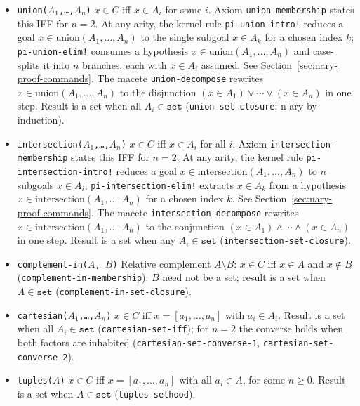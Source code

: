 \begin{itemize}

\item \texttt{union($A_1$,\ldots,$A_n$)}
  $x \in C$ iff $x \in A_i$ for some $i$.
  Axiom \texttt{union-membership} states this IFF for $n=2$.
  At any arity, the kernel rule \texttt{pi-union-intro!} reduces a goal
  $x \in \text{union}(A_1,\ldots,A_n)$ to the single subgoal $x \in A_k$
  for a chosen index $k$; \texttt{pi-union-elim!} consumes a hypothesis
  $x \in \text{union}(A_1,\ldots,A_n)$ and case-splits it into $n$
  branches, each with $x \in A_i$ assumed.  See
  Section~\ref{sec:nary-proof-commands}.
  The macete \texttt{union-decompose} rewrites
  $x \in \text{union}(A_1,\ldots,A_n)$ to the disjunction
  $(x \in A_1) \lor \cdots \lor (x \in A_n)$ in one step.
  Result is a set when all $A_i \in \mathtt{set}$
  (\texttt{union-set-closure}; n-ary by induction).

\item \texttt{intersection($A_1$,\ldots,$A_n$)}
  $x \in C$ iff $x \in A_i$ for all $i$.
  Axiom \texttt{intersection-membership} states this IFF for $n=2$.
  At any arity, the kernel rule \texttt{pi-intersection-intro!} reduces
  a goal $x \in \text{intersection}(A_1,\ldots,A_n)$ to $n$ subgoals
  $x \in A_i$; \texttt{pi-intersection-elim!} extracts $x \in A_k$ from
  a hypothesis $x \in \text{intersection}(A_1,\ldots,A_n)$ for a chosen
  index $k$.  See Section~\ref{sec:nary-proof-commands}.
  The macete \texttt{intersection-decompose} rewrites
  $x \in \text{intersection}(A_1,\ldots,A_n)$ to the conjunction
  $(x \in A_1) \land \cdots \land (x \in A_n)$ in one step.
  Result is a set when any $A_i \in \mathtt{set}$
  (\texttt{intersection-set-closure}).

\item \texttt{complement-in($A$, $B$)}
  Relative complement $A \setminus B$: $x \in C$ iff $x \in A$ and
  $x \notin B$ (\texttt{complement-in-membership}).
  $B$ need not be a set; result is a set when $A \in \mathtt{set}$
  (\texttt{complement-in-set-closure}).

\item \texttt{cartesian($A_1$,\ldots,$A_n$)}
  $x \in C$ iff $x = [a_1,\ldots,a_n]$ with $a_i \in A_i$.
  Result is a set when all $A_i \in \mathtt{set}$ (\texttt{cartesian-set-iff});
  for $n=2$ the converse holds when both factors are inhabited
  (\texttt{cartesian-set-converse-1}, \texttt{cartesian-set-converse-2}).

\item \texttt{tuples($A$)}
  $x \in C$ iff $x = [a_1,\ldots,a_n]$ with all $a_i \in A$,
  for some $n \ge 0$.
  Result is a set when $A \in \mathtt{set}$ (\texttt{tuples-sethood}).


\end{itemize}
